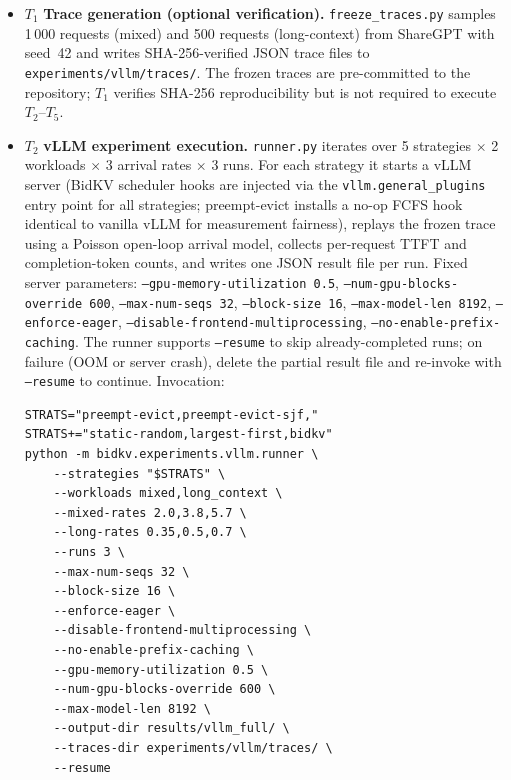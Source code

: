 \documentclass[conference]{IEEEtran}
\begin{document}
\begin{itemize}
  \item $T_1$ \textbf{Trace generation (optional verification).}
    \texttt{freeze\_traces.py} samples 1\,000 requests (mixed) and 500
    requests (long-context) from ShareGPT with seed~42 and writes
    SHA-256-verified JSON trace files to \texttt{experiments/vllm/traces/}.
    The frozen traces are pre-committed to the repository;
    $T_1$ verifies SHA-256 reproducibility but is not required
    to execute $T_2$--$T_5$.

  \item $T_2$ \textbf{vLLM experiment execution.}
    \texttt{runner.py} iterates over 5 strategies $\times$ 2 workloads
    $\times$ 3 arrival rates $\times$ 3 runs.
    For each strategy it starts a vLLM server (BidKV scheduler hooks are
    injected via the \texttt{vllm.general\_plugins} entry point for all
    strategies; preempt-evict installs a no-op FCFS hook identical to
    vanilla vLLM for measurement fairness), replays the frozen trace using a
    Poisson open-loop arrival model, collects per-request TTFT and
    completion-token counts, and writes one JSON result file per run.
    Fixed server parameters: \texttt{--gpu-memory-utilization~0.5},
    \texttt{--num-gpu-blocks-override~600}, \texttt{--max-num-seqs~32},
    \texttt{--block-size~16}, \texttt{--max-model-len~8192},
    \texttt{--enforce-eager}, \texttt{--disable-frontend-multiprocessing},
    \texttt{--no-enable-prefix-caching}.
    The runner supports \texttt{--resume} to skip already-completed
    runs; on failure (OOM or server crash), delete the partial result
    file and re-invoke with \texttt{--resume} to continue.
    Invocation:
    \begin{Verbatim}
STRATS="preempt-evict,preempt-evict-sjf,"
STRATS+="static-random,largest-first,bidkv"
python -m bidkv.experiments.vllm.runner \
    --strategies "$STRATS" \
    --workloads mixed,long_context \
    --mixed-rates 2.0,3.8,5.7 \
    --long-rates 0.35,0.5,0.7 \
    --runs 3 \
    --max-num-seqs 32 \
    --block-size 16 \
    --enforce-eager \
    --disable-frontend-multiprocessing \
    --no-enable-prefix-caching \
    --gpu-memory-utilization 0.5 \
    --num-gpu-blocks-override 600 \
    --max-model-len 8192 \
    --output-dir results/vllm_full/ \
    --traces-dir experiments/vllm/traces/ \
    --resume
    \end{Verbatim}


\end{itemize}
\end{document}
